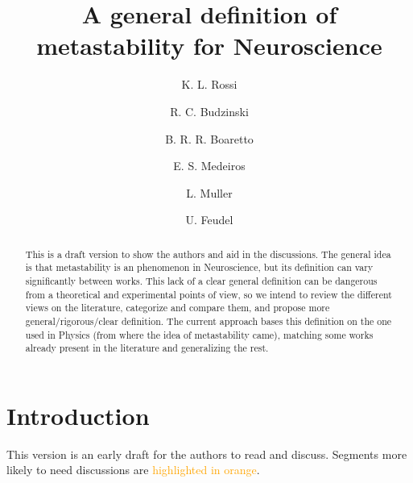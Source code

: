 \documentclass[preprint,superscriptaddress,showpacs,amsmath,amssymb,aps,pre,floatfix]{revtex4-1}
\theoremstyle{definition}
\begin{document}
\title{A general definition of metastability for Neuroscience}
\author{K. L. Rossi}
\author{R. C. Budzinski}
\author{B. R. R. Boaretto}
\author{E. S. Medeiros}
\author{L. Muller}
\author{U. Feudel}


\begin{abstract}
This is a draft version to show the authors and aid in the discussions. The general idea is that metastability is an phenomenon in Neuroscience, but its definition can vary significantly between works. This lack of a clear general definition can be dangerous from a theoretical and experimental points of view, so we intend to review the different views on the literature, categorize and compare them, and propose more general/rigorous/clear definition. The current approach bases this definition on the one used in Physics (from where the idea of metastability came), matching some works already present in the literature and generalizing the rest.
\end{abstract}

\maketitle
\tableofcontents
\section{Introduction}
This version is an early draft for the authors to read and discuss. Segments more likely to need discussions are \textcolor{orange}{highlighted in orange}. 
\end{document}

